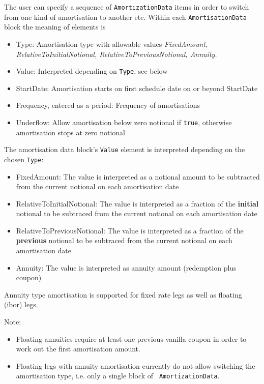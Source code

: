 The user can specify a sequence of {\tt AmortizationData} items in
order to switch from one kind of amortisation to another etc.  
Within each {\tt AmortisationData} block the meaning of elements is

\begin{itemize}
\item Type: Amortisation type with allowable values {\em FixedAmount,
  RelativeToInitialNotional, RelativeToPreviousNotional, Annuity.}
\item Value: Interpreted depending on {\tt Type}, see below
\item StartDate: Amortisation starts on first schedule date on or
  beyond StartDate
\item Frequency, entered as a period: Frequency of amortisations
\item Underflow:  Allow amortisation below zero notional if {\tt true},
  otherwise amortisation stops at zero notional 
\end{itemize}

The amortisation data block's {\tt Value} element  is interpreted
depending on the chosen {\tt Type}:
\begin{itemize}
\item FixedAmount: The value is interpreted as a notional amount to be
  subtracted from the current notional on each amortisation date
\item RelativeToInitialNotional: The value is interpreted as a
  fraction of the {\bf initial} notional to be subtraced from the current
  notional on each amortisation date
\item RelativeToPreviousNotional: The value is interpreted as a
  fraction of the {\bf previous} notional to be subtraced from the current
  notional on each amortisation date
\item Annuity: The value is interpreted as annuity amount (redemption
  plus coupon)
\end{itemize}

Annuity type amortisation is supported for fixed rate legs as well as
floating (ibor) legs. 

Note:
\begin{itemize}
\item Floating annuities require at least one previous vanilla coupon
  in order to work out the first amortisation amount. 
\item Floating legs with annuity amortisation currently do not allow
  switching the amortisation type, i.e. only a  single block of {\tt
    AmortizationData}.
\end{itemize}

